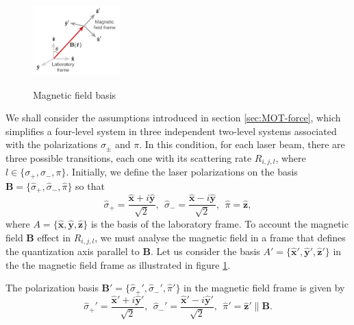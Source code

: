\begin{figure}
    \centering
    \vspace{-10px}
    \caption{Magnetic field basis}
    \includegraphics[width=0.3\textwidth]{USPSC-img/polarization_basis.png}
    \label{fig:magnetic-field-basis}
    \vspace{0px}
\end{figure}

We shall consider the assumptions introduced in section \ref{sec:MOT-force}, which simplifies a four-level system in three independent two-level systems associated with the polarizations $ \sigma_{\pm} $ and $ \pi $. In this condition, for each laser beam, there are three possible transitions, each one with its scattering rate $ R_{i,j,l} $, where $ l \in \{\sigma_{+}, \sigma_{-}, \pi \} $. Initially, we define the laser polarizations on the basis $ \mathbf{B} = \{\hat{\sigma}_{+}, \hat{\sigma}_{-}, \hat{\pi} \} $ so that
\begin{equation}
    \hat{\sigma}_+ = \frac{\mathbf{\hat{x}} + i\mathbf{\hat{y}}}{\sqrt{2}},\ \ \hat{\sigma}_- = \frac{\mathbf{\hat{x}} - i\mathbf{\hat{y}}}{\sqrt{2}},\ \ \hat{\pi} = \mathbf{\hat{z}},
\end{equation}
where $ A = \{\mathbf{\hat{x}}, \mathbf{\hat{y}}, \mathbf{\hat{z}}\} $ is the basis of the laboratory frame. To account the magnetic field $ \mathbf{B} $ effect in $ R_{i,j,l} $, we must analyse the magnetic field in a frame that defines the quantization axis parallel to $ \mathbf{B} $. Let us consider the basis $ A' = \{\mathbf{\hat{x}}', \mathbf{\hat{y}}', \mathbf{\hat{z}}'\} $ in the the magnetic field frame as illustrated in figure \ref{fig:magnetic-field-basis}.

The polarization basis $ \mathbf{B}' = \{\hat{\sigma}_{+}', \hat{\sigma}_{-}', \hat{\pi}' \} $ in the magnetic field frame is given by
\begin{equation}
    \hat{\sigma}_+' = \frac{\mathbf{\hat{x}'} + i\mathbf{\hat{y}}'}{\sqrt{2}},\ \ \hat{\sigma}_-' = \frac{\mathbf{\hat{x}'} - i\mathbf{\hat{y}}'}{\sqrt{2}},\ \ \hat{\pi}' = \mathbf{\hat{z}}' \| \mathbf{B}.
\end{equation}

